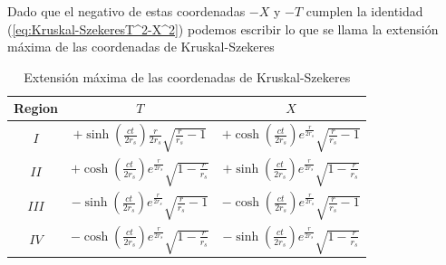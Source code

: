 Dado que el negativo de estas coordenadas $-X$ y $-T$ cumplen la identidad (\ref{eq:Kruskal-SzekeresT^2-X^2}) podemos escribir lo que se llama la extensión máxima de las coordenadas de Kruskal-Szekeres
\begin{table}[H]
    \centering
    \caption{Extensión máxima de las coordenadas de Kruskal-Szekeres}
    \begin{tabular}{|c|c|c|}
        \hline Region & $T$                                                                                         & $X$                                                                                \\
        \hline$I$        & $+\sinh \left(\frac{c t}{2 r_s}\right)\frac{r}{2 r_s} \sqrt{\frac{r}{r_s}-1}$ & $+\cosh \left(\frac{c t}{2 r_s}\right) e^{\frac{r}{2 r_s}} \sqrt{\frac{r}{r_s}-1}$ \\
        \hline$I I$       & $+\cosh \left(\frac{c t}{2 r_s}\right) e^{\frac{r}{2 r_s}} \sqrt{1-\frac{r}{r_s}}$          & $+\sinh \left(\frac{c t}{2 r_s}\right) e^{\frac{r}{2 r_s}} \sqrt{1-\frac{r}{r_s}}$ \\
        \hline$I I I$   & $-\sinh \left(\frac{c t}{2 r_s}\right) e^{\frac{r}{2 r_s}} \sqrt{\frac{r}{r_s}-1}$          & $-\cosh \left(\frac{c t}{2 r_s}\right) e^{\frac{r}{2 r_s}} \sqrt{\frac{r}{r_s}-1}$ \\
        \hline$I V$      & $-\cosh \left(\frac{c t}{2 r_s}\right) e^{\frac{r}{2 r_s}} \sqrt{1-\frac{r}{r_s}}$          & $-\sinh \left(\frac{c t}{2 r_s}\right) e^{\frac{r}{2 r_s}} \sqrt{1-\frac{r}{r_s}}$ \\
        \hline
    \end{tabular}
\end{table}

